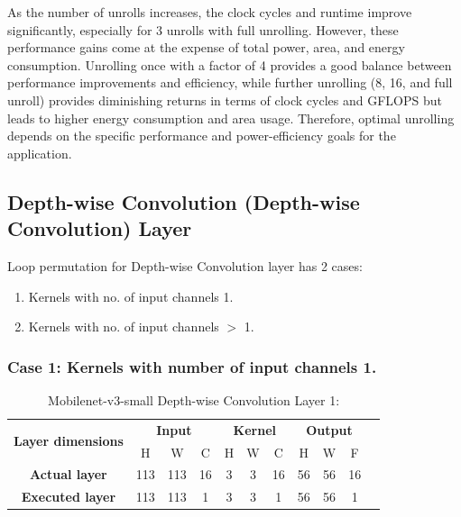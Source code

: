 As the number of unrolls increases, the clock cycles and runtime improve significantly, especially for 3 unrolls with full unrolling. However, these performance gains come at the expense of total power, area, and energy consumption. Unrolling once with a factor of 4 provides a good balance between performance improvements and efficiency, while further unrolling (8, 16, and full unroll) provides diminishing returns in terms of clock cycles and GFLOPS but leads to higher energy consumption and area usage. Therefore, optimal unrolling depends on the specific performance and power-efficiency goals for the application.


\subsection{Depth-wise Convolution (Depth-wise Convolution) Layer}


Loop permutation for Depth-wise Convolution layer has 2 cases:
\begin{enumerate}
 \item Kernels with no. of input channels 1.
 \item Kernels with no. of input channels $>$ 1.
\end{enumerate}


\subsubsection{Case 1: Kernels with number of input channels 1.}


\begin{table}[H]
\centering
\caption{Mobilenet-v3-small Depth-wise Convolution Layer 1:}
\label{tab:unrollDConvolutionCase1Dim}
 \begin{tabular}{|c|c|c|c|c|c|c|c|c|c|c|} \hline  
 
 \multirow{2}{*}{\textbf{Layer dimensions}} &  
 \multicolumn{3}{|c|}{\textbf{Input}} &  
 \multicolumn{3}{|c|}{\textbf{Kernel}} &  
 \multicolumn{3}{|c|}{\textbf{Output}}\\ \cline{2-10}
 & H &  W &  C&  H &  W &  C &  H &  W & F\\ \hline  
 \textbf{Actual layer} &  113 &  113 & 16 & 3 & 3 & 16 & 56 & 56 & 16\\ \hline 
 \textbf{Executed layer} &  113 &  113 &  \cellcolor{yellow}1 & 3 & 3 & \cellcolor{yellow}1 & 56 & 56 & \cellcolor{yellow}1 \\ \hline 
 \end{tabular}
\end{table}

